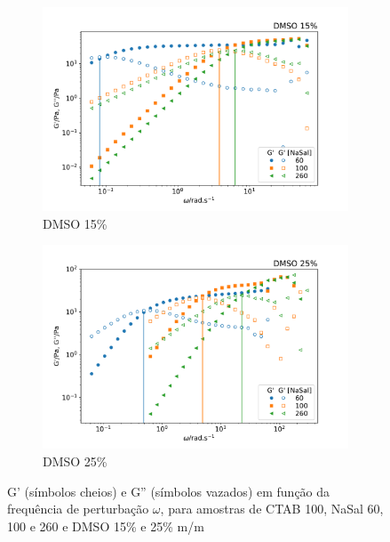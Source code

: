 	\begin{figure}[h]
		\begin{subfigure}[t]{0.5\textwidth}
			\centering
			\includegraphics[width=\textwidth]{imagens/reologia/oscilatorio_dmso15p}
			\caption{DMSO 15\%}
			\label{fig:oscilatorio_dmso_15p}
		\end{subfigure} %
		\begin{subfigure}[t]{0.5\textwidth}
			\centering
			\includegraphics[width=\textwidth]{imagens/reologia/oscilatorio_dmso25p}
			\caption{DMSO 25\%}
			\label{fig:oscilatorio_dmso_25p}
		\end{subfigure} %
		\caption{G' (símbolos cheios) e G'' (símbolos vazados) em função da frequência de perturbação \(\omega\), para amostras de CTAB 100\mM{}, NaSal 60, 100 e 260\mM{} e DMSO 15\% e 25\% m/m}
		\label{fig:oscilatorio_dmso}
	\end{figure}
	
